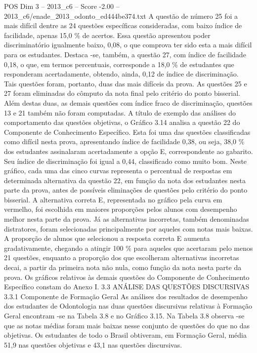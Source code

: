 \begin{textsample}{POS Dim 3 – 2013\_c6 – Score -2.00 – 2013\_c6/enade\_2013\_odonto\_ed444be374.txt}
A questão de número 25 foi a mais difícil dentre as 24 questões específicas consideradas, com baixo índice de facilidade, apenas 15,0 \% de acertos.
Essa questão apresentou poder discriminatório igualmente baixo, 0,08, o que comprova ter sido esta a mais difícil para os estudantes.
Destaca -se, também, a questão 27, com índice de facilidade 0,18, o que, em termos percentuais, corresponde a 18,0 \% de estudantes que responderam acertadamente, obtendo, ainda, 0,12 de índice de discriminação.
Tais questões foram, portanto, duas das mais difíceis da prova.
As questões 25 e 27 foram eliminadas do cômputo da nota final pelo critério do ponto bisserial.
Além destas duas, as demais questões com índice fraco de discriminação, questões 13 e 21 também não foram computadas.
A título de exemplo das análises do comportamento das questões objetivas, o Gráfico 3.14 analisa a questão 22 do Componente de Conhecimento Específico.
Esta foi uma das questões classificadas como difícil nesta prova, apresentando índice de facilidade 0,38, ou seja, 38,0 \% dos estudantes assinalaram acertadamente a opção E, correspondente ao gabarito.
Seu índice de discriminação foi igual a 0,44, classificado como muito bom.
Neste gráfico, cada uma das cinco curvas representa o percentual de respostas em determinada alternativa da questão 22, em função da nota dos estudantes nesta parte da prova, antes de possíveis eliminações de questões pelo critério do ponto bisserial.
A alternativa correta E, representada no gráfico pela curva em vermelho, foi escolhida em maiores proporções pelos alunos com desempenho melhor nesta parte da prova.
Já as alternativas incorretas, também denominadas distratores, foram selecionadas principalmente por aqueles com notas mais baixas.
A proporção de alunos que selecionou a resposta correta E aumenta gradativamente, chegando a atingir 100 \% para aqueles que acertaram pelo menos 21 questões, enquanto a proporção dos que escolheram alternativas incorretas decai, a partir da primeira nota não nula, como função da nota nesta parte da prova.
Os gráficos relativos às demais questões do Componente de Conhecimento Específico constam do Anexo I. 3.3 ANÁLISE DAS QUESTÕES DISCURSIVAS 3.3.1 Componente de Formação Geral As análises dos resultados de desempenho dos estudantes de Odontologia nas duas questões discursivas relativas à Formação Geral encontram -se na Tabela 3.8 e no Gráfico 3.15.
Na Tabela 3.8 observa -se que as notas médias foram mais baixas nesse conjunto de questões do que no das objetivas.
Os estudantes de todo o Brasil obtiveram, em Formação Geral, média 51,9 nas questões objetivas e 43,1 nas questões discursivas.

\end{textsample}
